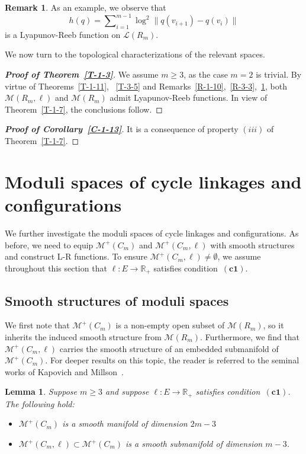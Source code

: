 \documentclass[11pt,letterpaper]{amsart}
\theoremstyle{plain}
\newtheorem{lemma}[theorem]{Lemma}
\theoremstyle{definition}
\newtheorem{remark}[theorem]{Remark}
\theoremstyle{remark}
\numberwithin{equation}{section}
\begin{document}
\begin{remark}\label{R-3-6}
As an example, we observe that
\[
h(q)=\sum\nolimits_{i=1}^{m-1}\log^2\|q(v_{i+1})-q(v_i)\|
\]
is a Lyapunov-Reeb function on $\mathcal L(R_m)$.
\end{remark}

We now turn to the topological characterizations of the relevant spaces.

\begin{proof}[\textbf{Proof of Theorem~\ref{T-1-3}}]
We assume $m\geq 3$, as the case $m=2$ is trivial. By virtue of Theorems~\ref{T-1-11}, ~\ref{T-3-5} and Remarks~\ref{R-1-10},~\ref{R-3-3},~\ref{R-3-6}, both
$\mathcal M(R_m,\ell)$ and $\mathcal M(R_m)$ admit Lyapunov-Reeb functions. In view of Theorem~\ref{T-1-7}, the conclusions follow.
\end{proof}

\begin{proof}[\textbf{Proof of Corollary~\ref{C-1-13}}]
It is a consequence of property $(iii)$ of Theorem~\ref{T-1-7}.
\end{proof}


\section{Moduli spaces of cycle linkages and configurations}\label{S-4}
We further investigate the moduli spaces of cycle linkages and configurations. As before, we need to equip
$\mathcal M^{+}(C_m)$ and $\mathcal M^{+}(C_m,\ell)$ with smooth structures and construct L-R functions. To ensure
$\mathcal M^{+}(C_m,\ell)\neq \emptyset$, we assume throughout this section that $\ell:E\to\mathbb R_{+}$ satisfies condition~$\mathrm{\mathbf{(c1)}}$.

\subsection{Smooth structures of moduli spaces}
We first note that $\mathcal M^{+}(C_m)$ is a non-empty open subset of
$\mathcal M(R_m)$, so it inherits the induced smooth structure from $\mathcal M(R_m)$.
Furthermore, we find that $\mathcal M^{+}(C_m,\ell)$ carries the smooth structure of an embedded submanifold of $\mathcal M^{+}(C_m)$.
For deeper results on this topic, the reader is referred to the seminal works of Kapovich and Millson~\cite{Kapovich-1995, Kapovich-1996,Kapovich-2002}.

\begin{lemma}\label{L-4-1}
Suppose $m\geq 3$ and suppose $\ell:E\to\mathbb R_{+}$ satisfies
condition~$\mathrm{\mathbf{(c1)}}$. The following hold:
\begin{itemize}
\item[$(i)$]$\mathcal M^{+}(C_m)$ is a smooth manifold of dimension $2m-3$
\item[$(ii)$]$\mathcal M^{+}(C_m,\ell)\subset \mathcal M^{+}(C_m)$ is a smooth submanifold of dimension $m-3$.
\end{itemize}
\end{lemma}
\end{document}
